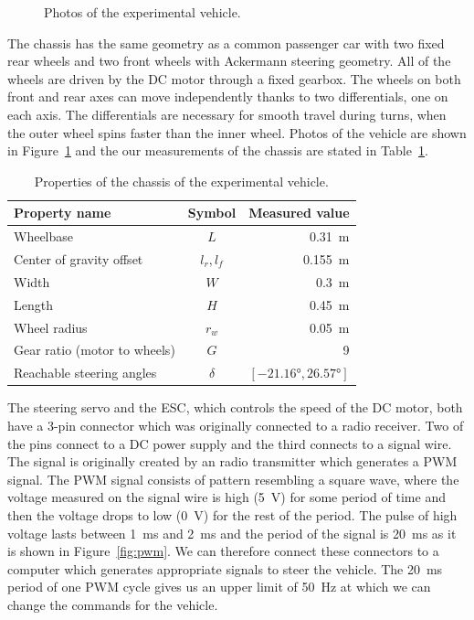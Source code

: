 \begin{figure}[!tbp]
	\caption{Photos of the experimental vehicle.}
	\label{fig:chassis}
\end{figure}

The chassis has the same geometry as a common passenger car with two fixed rear wheels and two front wheels with Ackermann steering geometry. All of the wheels are driven by the \gls*{DC} motor through a fixed gearbox. The wheels on both front and rear axes can move independently thanks to two differentials, one on each axis. The differentials are necessary for smooth travel during turns, when the outer wheel spins faster than the inner wheel. Photos of the vehicle are shown in Figure~\ref{fig:chassis} and the our measurements of the chassis are stated in Table~\ref{table:dimensions}.

\begin{table}
	\centering
	\begin{tabular}{l c r}
		\toprule
		Property name & Symbol & Measured value \\
		\midrule
		
		Wheelbase & $L$ & \SI{0.31}{\meter} \\
		Center of gravity offset & $l_r, l_f$ & \SI{0.155}{\meter} \\
		Width & $W$ & \SI{0.3}{\meter} \\
		Length & $H$ & \SI{0.45}{\meter} \\
		Wheel radius & $r_w$ & \SI{0.05}{\meter} \\
		Gear ratio (motor to wheels) & $G$ & \num{9} \\
		Reachable steering angles & $\delta$ & $\left[\ang{-21.16}, \ang{26.57}\right]$ \\
		\bottomrule
	\end{tabular}
	\caption{Properties of the chassis of the experimental vehicle.}
	\label{table:dimensions}
\end{table}

The steering servo and the \gls*{ESC}, which controls the speed of the \gls*{DC} motor, both have a 3-pin connector which was originally connected to a radio receiver. Two of the pins connect to a \gls*{DC} power supply and the third connects to a signal wire. The signal is originally created by an radio transmitter which generates a \gls{PWM} signal. The \gls*{PWM} signal consists of pattern resembling a square wave, where the voltage measured on the signal wire is high (\SI{5}{\volt}) for some period of time and then the voltage drops to low (\SI{0}{\volt}) for the rest of the period. The pulse of high voltage lasts between \SI{1}{\milli\second} and \SI{2}{\milli\second} and the period of the signal is \SI{20}{\milli\second} as it is shown in Figure~\ref{fig:pwm}. We can therefore connect these connectors to a computer which generates appropriate signals to steer the vehicle. The \SI{20}{\milli\second} period of one \gls*{PWM} cycle gives us an upper limit of \SI{50}{\hertz} at which we can change the commands for the vehicle.

